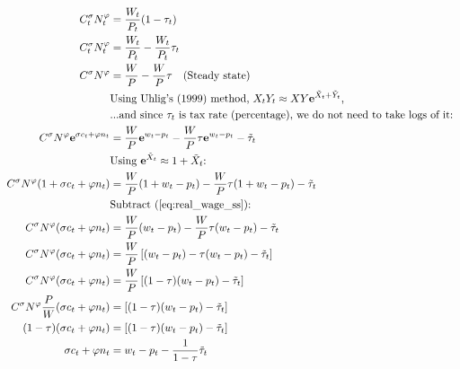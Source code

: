 \begin{align}
    C_t^\sigma N_t^\varphi &= \frac{W_t}{P_t}(1-\tau_t) \\
    C_t^\sigma N_t^\varphi &= \frac{W_t}{P_t} - \frac{W_t}{P_t}\tau_t \\
    C^\sigma N^\varphi &= \frac{W}{P} - \frac{W}{P}\tau \label{eq:real_wage_ss} \quad \text{(Steady state)}\\
    &\text{Using Uhlig's (1999) method, $X_tY_t \approx XY\mathbf{e}^{\tilde{X}_t + \tilde{Y}_t}$, }\\
    &\text{...and since $\tau_t$ is tax rate (percentage), we do not need to take logs of it: }\\
    C^\sigma N^\varphi\mathbf{e}^{\sigma c_t + \varphi n_t} &= \frac{W}{P}\mathbf{e}^{w_t - p_t} - \frac{W}{P}\tau \mathbf{e}^{w_t - p_t} - \tilde{\tau}_t\\
    &\text{Using $\mathbf{e}^{\tilde{X}_t} \approx 1 + {\tilde{X}_t}$: }\\
    C^\sigma N^\varphi({1+\sigma c_t + \varphi n_t}) &= \frac{W}{P}({1+ w_t - p_t}) - \frac{W}{P}\tau ({1+ w_t - p_t}) - \tilde{\tau}_t\\
    &\text{Subtract (\ref{eq:real_wage_ss}): } \\
    C^\sigma N^\varphi({\sigma c_t + \varphi n_t}) &= \frac{W}{P}({w_t - p_t}) - \frac{W}{P}\tau ({w_t - p_t }) - \tilde{\tau}_t\\
    C^\sigma N^\varphi({\sigma c_t + \varphi n_t}) &= \frac{W}{P}\left[({w_t - p_t}) - \tau ({w_t - p_t}) - \tilde{\tau}_t\right]\\
    C^\sigma N^\varphi({\sigma c_t + \varphi n_t}) &= \frac{W}{P}\left[(1-\tau)({w_t - p_t}) - \tilde{\tau}_t\right]\\
    C^\sigma N^\varphi \frac{P}{W} ({\sigma c_t + \varphi n_t})  &= \left[(1-\tau)({w_t - p_t}) - \tilde{\tau}_t\right]\\
    (1-\tau)({\sigma c_t + \varphi n_t})  &= \left[(1-\tau)({w_t - p_t}) - \tilde{\tau}_t\right]\\
    {\sigma c_t + \varphi n_t}  &= {w_t - p_t} - \frac{1}{1-\tau}\tilde{\tau}_t\\
\end{align}
\pagebreak

